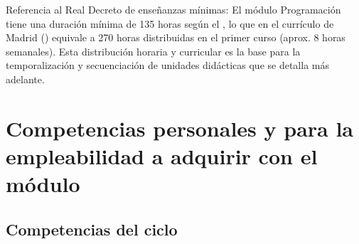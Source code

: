 


Referencia al Real Decreto de enseñanzas mínimas: El módulo Programación tiene una duración mínima de 135 horas según el , lo que en el currículo de Madrid () equivale a 270 horas distribuidas en el primer curso (aprox. 8 horas semanales). Esta distribución horaria y curricular es la base para la temporalización y secuenciación de unidades didácticas que se detalla más adelante.




\section{Competencias personales y para la empleabilidad a adquirir con el módulo}
\subsection{Competencias del ciclo}

